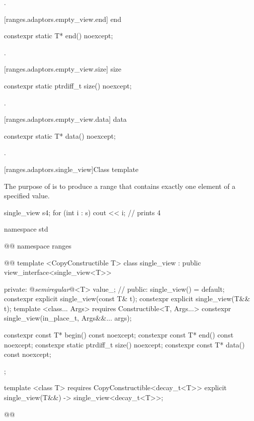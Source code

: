 \begin{itemdescr}
\pnum
\returns {}.
\end{itemdescr}

[ranges.adaptors.empty_view.end]{ end}

%
\begin{itemdecl}
constexpr static T* end() noexcept;
\end{itemdecl}

\begin{itemdescr}
\pnum
\returns {}.
\end{itemdescr}

[ranges.adaptors.empty_view.size]{ size}

%
\begin{itemdecl}
constexpr static ptrdiff_t size() noexcept;
\end{itemdecl}

\begin{itemdescr}
\pnum
\returns {}.
\end{itemdescr}

[ranges.adaptors.empty_view.data]{ data}

%
\begin{itemdecl}
constexpr static T* data() noexcept;
\end{itemdecl}

\begin{itemdescr}
\pnum
\returns {}.
\end{itemdescr}

[ranges.adaptors.single_view]{Class template }

\pnum
The purpose of  is to produce a range that contains exactly
one element of a specified value.

\pnum
\enterexample
\begin{codeblock}
single_view s{4};
for (int i : s)
  cout << i; // prints 4
\end{codeblock}
\exitexample

\begin{codeblock}
namespace std { @@ namespace ranges { @@
  template <CopyConstructible T>
  class single_view : public view_interface<single_view<T>> {
  private:
    @\textit{semiregular}@<T> value_; // \expos
  public:
    single_view() = default;
    constexpr explicit single_view(const T& t);
    constexpr explicit single_view(T&& t);
    template <class... Args>
      requires Constructible<T, Args...>
    constexpr single_view(in_place_t, Args&&... args);

    constexpr const T* begin() const noexcept;
    constexpr const T* end() const noexcept;
    constexpr static ptrdiff_t size() noexcept;
    constexpr const T* data() const noexcept;
  };

  template <class T>
    requires CopyConstructible<decay_t<T>>
  explicit single_view(T&&) -> single_view<decay_t<T>>;
}}@\removed{\}\}}@
\end{codeblock}

